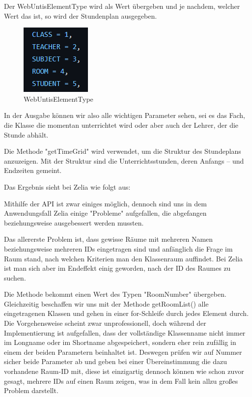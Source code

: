 
Der WebUntisElementType wird als Wert übergeben und je nachdem, welcher Wert das ist, so wird der Stundenplan ausgegeben. 

\begin{figure}[h]
    \centering
    \includegraphics{media/WebUntis/WebUntisElementType.png}
    \caption{WebUntisElementType}
\end{figure}


In der Ausgabe können wir also alle wichtigen Parameter sehen, sei es das Fach, die Klasse die momentan unterrichtet wird oder aber auch der Lehrer, der die Stunde abhält.


Die Methode "getTimeGrid" wird verwendet, um die Struktur des Stundeplans anzuzeigen. Mit der Struktur sind die Unterrichtsstunden, deren Anfangs – und Endzeiten gemeint.


Das Ergebnis sieht bei Zelia wie folgt aus:



Mithilfe der API ist zwar einiges möglich, dennoch sind uns in dem Anwendungsfall Zelia einige "Probleme" aufgefallen, die abgefangen beziehungsweise ausgebessert werden mussten.

Das allererste Problem ist, dass gewisse Räume mit mehreren Namen beziehungsweise mehreren IDs eingetragen sind und anfänglich die Frage im Raum stand, nach welchen Kriterien man den Klassenraum auffindet. Bei Zelia ist man sich aber im Endeffekt einig geworden, nach der ID des Raumes zu suchen.



Die Methode bekommt einen Wert des Typen "RoomNumber" übergeben. Gleichzeitig beschaffen wir uns mit der Methode getRoomList() alle eingetragenen Klassen und gehen in einer for-Schleife durch jedes Element durch. Die Vorgehensweise scheint zwar unprofessionell, doch während der Implementierung ist aufgefallen, dass der vollständige Klassenname nicht immer im Longname oder im Shortname abgespeichert, sondern eher rein zufällig in einem der beiden Parametern beinhaltet ist. Deswegen prüfen wir auf Nummer sicher beide Parameter ab und geben bei einer Übereinstimmung die dazu vorhandene Raum-ID mit, diese ist einzigartig dennoch können wie schon zuvor gesagt, mehrere IDs auf einen Raum zeigen, was in dem Fall kein allzu großes Problem darstellt.


